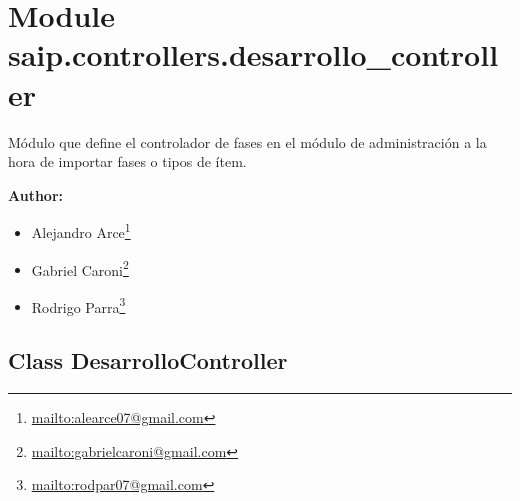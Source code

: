 %
%
%


\section{Module saip.controllers.desarrollo\_controller}

    \label{saip:controllers:desarrollo_controller}
Módulo que define el controlador de fases en el módulo de administración a 
la hora de importar fases o tipos de ítem.

\textbf{Author:} \begin{itemize}
\setlength{\parskip}{0.6ex}
  \item Alejandro 
    Arce\footnote{\href{mailto:alearce07@gmail.com}{mailto:alearce07@gmail.com}}

  \item Gabriel 
    Caroni\footnote{\href{mailto:gabrielcaroni@gmail.com}{mailto:gabrielcaroni@gmail.com}}

  \item Rodrigo 
    Parra\footnote{\href{mailto:rodpar07@gmail.com}{mailto:rodpar07@gmail.com}}

\end{itemize}





\subsection{Class DesarrolloController}

